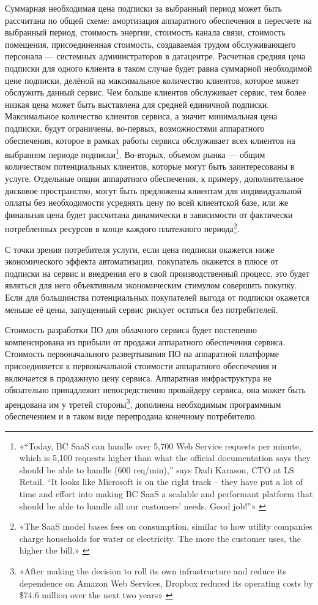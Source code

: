 \documentclass{article}
\begin{document}
Суммарная необходимая цена подписки за выбранный период может быть рассчитана по общей схеме: амортизация аппаратного обеспечения в пересчете на выбранный период, стоимость энергии, стоимость канала связи, стоимость помещения, присоединенная стоимость, создаваемая трудом обслуживающего персонала — системных администраторов в датацентре. Расчетная средняя цена подписки для одного клиента в таком случае будет равна суммарной необходимой цене подписки, делёной на максимальное количество клиентов, которое может обслужить данный сервис. Чем больше клиентов обслуживает сервис, тем более низкая цена может быть выставлена для средней единичной подписки. Максимальное количество клиентов сервиса, а значит минимальная цена подписки, будут ограничены, во-первых, возможностями аппаратного обеспечения, которое в рамках работы сервиса обслуживает всех клиентов на выбранном периоде подписки\footnote{«“Today, BC SaaS can handle over 5,700 Web Service requests per minute, which is 5,100 requests higher than what the official documentation says they should be able to handle (600 req/min),” says Dadi Karason, CTO at LS Retail. “It looks like Microsoft is on the right track – they have put a lot of time and effort into making BC SaaS a scalable and performant platform that should be able to handle all our customers’ needs. Good job!”» \cite{erpSaas}}. Во-вторых, объемом рынка — общим количеством потенциальных клиентов, которые могут быть заинтересованы в услуге. Отдельные опции аппаратного обеспечения, к примеру, дополнительное дисковое пространство, могут быть предложены клиентам для индивидуальной оплаты без необходимости усреднять цену по всей клиентской базе, или же финальная цена будет рассчитана динамически в зависимости от фактически потребленных ресурсов в конце каждого платежного периода\footnote{«The SaaS model bases fees on consumption, similar to how utility companies charge households for water or electricity. The more the customer uses, the higher the bill.» \cite{sellingServices}}.

С точки зрения потребителя услуги, если цена подписки окажется ниже экономического эффекта автоматизации, покупатель окажется в плюсе от подписки на сервис и внедрения его в свой производственный процесс, это будет являться для него объективным экономическим стимулом совершить покупку. Если для большинства потенциальных покупателей выгода от подписки окажется меньше её цены, запущенный сервис рискует остаться без потребителей.

Стоимость разработки ПО для облачного сервиса будет постепенно компенсирована из прибыли от продажи аппаратного обеспечения сервиса. Стоимость первоначального развертывания ПО на аппаратной платформе присоединяется к первоначальной стоимости аппаратного обеспечения и включается в продажную цену сервиса. Аппаратная инфраструктура не обязательно принадлежит непосредственно провайдеру сервиса, она может быть арендована им у третей стороны\footnote{«After making the decision to roll its own infrastructure and reduce its dependence on Amazon Web Services, Dropbox reduced its operating costs by \$74.6 million over the next two years» \cite{dropboxBuildsOwnInfra}}, дополнена необходимым программным обеспечением и в таком виде перепродана конечному потребителю.
\end{document}
